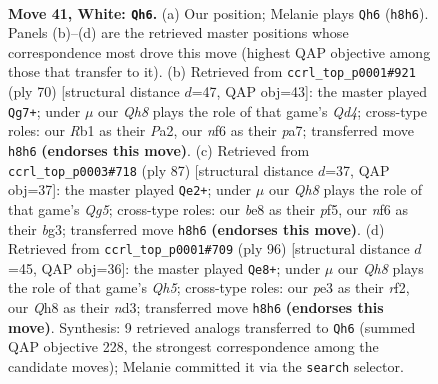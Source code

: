 \documentclass[11pt]{article}
\begin{document}
\clearpage

\begin{figure}[p]\centering
\begin{subfigure}{0.46\textwidth}\centering
\resizebox{\linewidth}{!}{%
\newchessgame
\chessboard[
  setfen={4b2Q/5k2/5n2/3P4/8/r3p1p1/P1P3P1/1R2K3 w - - 2 41},
  showmover=false,
  pgfstyle=straightmove, color=movearrow, markmove={h8-h6}
]}
\caption{}
\end{subfigure}\hfill
\begin{subfigure}{0.46\textwidth}\centering
\resizebox{\linewidth}{!}{%
\newchessgame
\chessboard[
  setfen={2r5/pp1bk3/8/8/3Q4/5P1P/P3r1P1/6K1 w - - 2 36},
  showmover=false,
  pgfstyle=straightmove, color=movearrow, markmove={d4-g7}
]}
\caption{}
\end{subfigure}
\\[4pt]
\begin{subfigure}{0.46\textwidth}\centering
\resizebox{\linewidth}{!}{%
\newchessgame
\chessboard[
  setfen={5k2/7R/7p/2p1pP2/P5q1/2P3B1/P6K/R7 b - - 2 44},
  showmover=false,
  pgfstyle=straightmove, color=movearrow, markmove={g4-e2}
]}
\caption{}
\end{subfigure}\hfill
\begin{subfigure}{0.46\textwidth}\centering
\resizebox{\linewidth}{!}{%
\newchessgame
\chessboard[
  setfen={6k1/1P4p1/n7/4b2Q/1P6/3nN1PP/2p2r2/7K w - - 2 49},
  showmover=false,
  pgfstyle=straightmove, color=movearrow, markmove={h5-e8}
]}
\caption{}
\end{subfigure}
\caption{\textbf{Move 41, White: \texttt{Qh6}.} (a) Our position; Melanie plays \texttt{Qh6} (\texttt{h8h6}). Panels (b)--(d) are the retrieved master positions whose correspondence most drove this move (highest QAP objective among those that transfer to it). (b) Retrieved from \texttt{ccrl\_top\_p0001\#921} (ply 70) [structural distance $d$=47, QAP obj=43]: the master played \texttt{Qg7+}; under $\mu$ our \emph{Qh8} plays the role of that game's \emph{Qd4}; cross-type roles: our \emph{R}b1 as their \emph{P}a2, our \emph{n}f6 as their \emph{p}a7; transferred move \texttt{h8h6} \textbf{(endorses this move)}. (c) Retrieved from \texttt{ccrl\_top\_p0003\#718} (ply 87) [structural distance $d$=37, QAP obj=37]: the master played \texttt{Qe2+}; under $\mu$ our \emph{Qh8} plays the role of that game's \emph{Qg5}; cross-type roles: our \emph{b}e8 as their \emph{p}f5, our \emph{n}f6 as their \emph{b}g3; transferred move \texttt{h8h6} \textbf{(endorses this move)}. (d) Retrieved from \texttt{ccrl\_top\_p0001\#709} (ply 96) [structural distance $d$=45, QAP obj=36]: the master played \texttt{Qe8+}; under $\mu$ our \emph{Qh8} plays the role of that game's \emph{Qh5}; cross-type roles: our \emph{p}e3 as their \emph{r}f2, our \emph{Q}h8 as their \emph{n}d3; transferred move \texttt{h8h6} \textbf{(endorses this move)}. Synthesis: 9 retrieved analogs transferred to \texttt{Qh6} (summed QAP objective 228, the strongest correspondence among the candidate moves); Melanie committed it via the \texttt{search} selector.}
\label{fig:thought-m80}
\end{figure}
\end{document}
